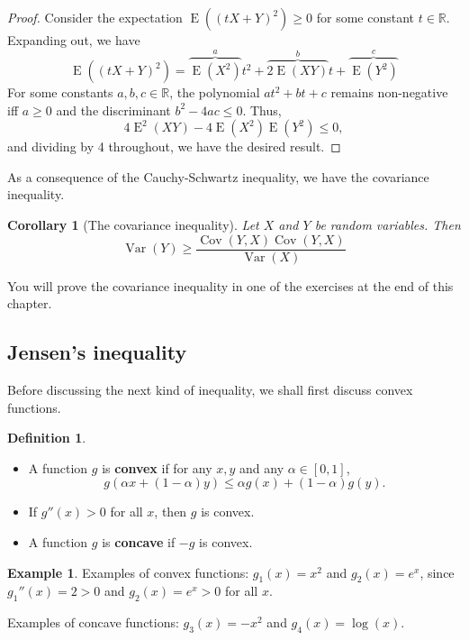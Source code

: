 \documentclass[
]{book}
\DeclareMathOperator{\E}{E}
\DeclareMathOperator{\Var}{Var}
\DeclareMathOperator{\Cov}{Cov}
\newcommand{\bbR}{\mathbb{R}}
\newtheorem{corollary}{Corollary}[chapter]
\theoremstyle{definition}
\newtheorem{definition}{Definition}[chapter]
\theoremstyle{definition}
\newtheorem{example}{Example}[chapter]
\theoremstyle{definition}
\theoremstyle{definition}
\theoremstyle{remark}
\begin{document}
\begin{proof}
Consider the expectation \(\E((tX+Y)^2)\geq 0\) for some constant \(t\in\bbR\).
Expanding out, we have
\[
\E((tX+Y)^2) = \overbrace{\E(X^2)}^{a}t^2 + \overbrace{2\E(XY)}^{b}t+ \overbrace{\E(Y^2)}^{c}
\]
For some constants \(a,b,c\in\bbR\), the polynomial \(at^2 +bt + c\) remains non-negative iff \(a\geq 0\) and the discriminant \(b^2-4ac \leq 0\). Thus,
\[
4\E^2(XY) - 4\E(X^2)\E(Y^2) \leq 0,
\]
and dividing by 4 throughout, we have the desired result.
\end{proof}

As a consequence of the Cauchy-Schwartz inequality, we have the covariance inequality.

\begin{corollary}[The covariance inequality]
Let \(X\) and \(Y\) be random variables. Then
\[\Var(Y) \geq \frac{\Cov(Y,X)\Cov(Y,X)}{\Var(X)}\]
\end{corollary}

You will prove the covariance inequality in one of the exercises at the end of this chapter.

\hypertarget{jensens-inequality}{%
\subsection{Jensen's inequality}\label{jensens-inequality}}

Before discussing the next kind of inequality, we shall first discuss convex functions.

\begin{definition}

\begin{itemize}
\item
  A function \(g\) is \textbf{convex} if for any \(x,y\) and any
  \(\alpha \in [0,1]\),
  \[g(\alpha x + (1-\alpha)y) \leq \alpha g(x) + (1-\alpha)g(y).\]
\item
  If \(g''(x)>0\) for all \(x\), then \(g\) is convex.
\item
  A function \(g\) is \textbf{concave} if \(-g\) is convex.
\end{itemize}

\end{definition}

\begin{example}
Examples of convex functions: \(g_1(x) = x^2\) and \(g_2(x) = e^x\), since
\(g_1''(x) = 2>0\) and \(g_2(x)=e^x > 0\) for all \(x\).

Examples of concave functions: \(g_3(x) = -x^2\) and \(g_4(x) = \log(x)\).
\end{example}
\end{document}
